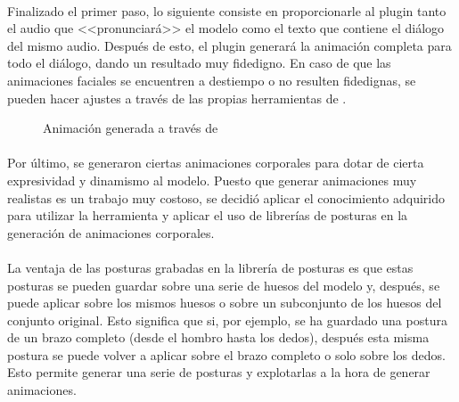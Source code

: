 \documentclass{subfiles}
\begin{document}
    \paragraph{}
    Finalizado el primer paso, lo siguiente consiste en proporcionarle al plugin tanto el audio que <<pronunciará>> el modelo como el texto que contiene el diálogo del mismo audio. Después de esto, el plugin generará la animación completa para todo el diálogo, dando un resultado muy fidedigno. En caso de que las animaciones faciales se encuentren a destiempo o no resulten fidedignas, se pueden hacer ajustes a través de las propias herramientas de \blender.

    \begin{figure}%
    \centering
    \caption{Animación generada a través de \rhubarb}
    \label{fig:4.2.2_rhubarb}
    \end{figure}

    \paragraph{}
    Por último, se generaron ciertas animaciones corporales para dotar de cierta expresividad y dinamismo al modelo. Puesto que generar animaciones muy realistas es un trabajo muy costoso, se decidió aplicar el conocimiento adquirido para utilizar la herramienta \rhubarb y aplicar el uso de librerías de posturas en la generación de animaciones corporales.

    \paragraph{}
    La ventaja de las posturas grabadas en la librería de posturas es que estas posturas se pueden guardar sobre una serie de huesos del modelo y, después, se puede aplicar sobre los mismos huesos o sobre un subconjunto de los huesos del conjunto original. Esto significa que si, por ejemplo, se ha guardado una postura de un brazo completo (desde el hombro hasta los dedos), después esta misma postura se puede volver a aplicar sobre el brazo completo o solo sobre los dedos. Esto permite generar una serie de posturas y explotarlas a la hora de generar animaciones.
\end{document}
